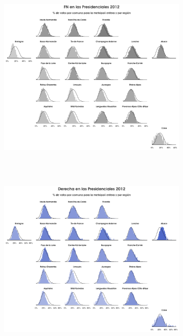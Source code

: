 \begin{figure}[h]
	\centering
	\begin{subfigure}{0.3\textwidth}
	\includegraphics[width = \textwidth]{Figs/AED/Geofacet_Distr_por_Reg_P12_FN}
	\end{subfigure}\\	
	~
	\begin{subfigure}{0.3\textwidth}
	\includegraphics[width = \textwidth]{Figs/AED/Geofacet_Distr_por_Reg_P12_Derecha}
	\end{subfigure}
	~
	\begin{subfigure}{0.3\textwidth}

\end{subfigure}
\end{figure}
